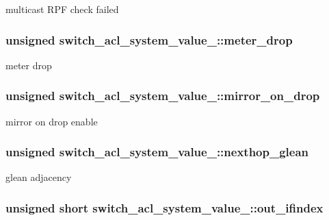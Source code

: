 multicast R\+P\+F check failed \hypertarget{unionswitch__acl__system__value___a59188b1795cbd4db9fde1e9f48c3a4f0}{
\subsubsection[{meter\+\_\+drop}]{\setlength{\rightskip}{0pt plus 5cm}unsigned switch\+\_\+acl\+\_\+system\+\_\+value\+\_\+\+::meter\+\_\+drop}}\label{unionswitch__acl__system__value___a59188b1795cbd4db9fde1e9f48c3a4f0}
meter drop \hypertarget{unionswitch__acl__system__value___a41f506937bebbecd9eada8aed4c02151}{
\subsubsection[{mirror\+\_\+on\+\_\+drop}]{\setlength{\rightskip}{0pt plus 5cm}unsigned switch\+\_\+acl\+\_\+system\+\_\+value\+\_\+\+::mirror\+\_\+on\+\_\+drop}}\label{unionswitch__acl__system__value___a41f506937bebbecd9eada8aed4c02151}
mirror on drop enable \hypertarget{unionswitch__acl__system__value___a91e620597c4b72cc2048727f8d5815c5}{
\subsubsection[{nexthop\+\_\+glean}]{\setlength{\rightskip}{0pt plus 5cm}unsigned switch\+\_\+acl\+\_\+system\+\_\+value\+\_\+\+::nexthop\+\_\+glean}}\label{unionswitch__acl__system__value___a91e620597c4b72cc2048727f8d5815c5}
glean adjacency \hypertarget{unionswitch__acl__system__value___a7dbba03ec54f1df15e9db1e033214200}{
\subsubsection[{out\+\_\+ifindex}]{\setlength{\rightskip}{0pt plus 5cm}unsigned short switch\+\_\+acl\+\_\+system\+\_\+value\+\_\+\+::out\+\_\+ifindex}}\label{unionswitch__acl__system__value___a7dbba03ec54f1df15e9db1e033214200}
